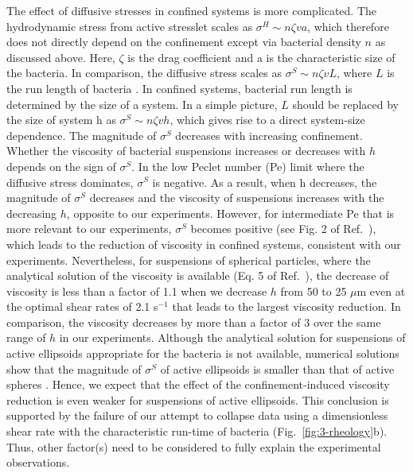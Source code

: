 The effect of diffusive stresses in confined systems is more complicated. The hydrodynamic stress from active stresslet scales as $\sigma^H \sim n\zeta v a$, which therefore does not directly depend on the confinement except via bacterial density $n$ as discussed
above. Here, $\zeta$ is the drag coefficient and a is the characteristic size of the bacteria. In comparison, the diffusive stress scales as $\sigma^S \sim n \zeta v L$, where $L$ is the run length of bacteria \cite{Takatori}. In confined systems, bacterial run length is determined by the size of a system. In a simple picture, $L$ should be replaced by the size of system h as $\sigma^S \sim n \zeta v h$, which gives rise to a direct system-size dependence. The magnitude of $\sigma^S$ decreases with increasing confinement. Whether the viscosity of bacterial suspensions increases or decreases with $h$ depends on the sign of $\sigma^S$. In the low Peclet number (Pe) limit where the diffusive stress dominates, $\sigma^S$ is negative. As a result, when h decreases, the magnitude of $\sigma^S$ decreases and the viscosity of suspensions increases with the decreasing $h$, opposite to our experiments.
However, for intermediate Pe that is more relevant to our experiments, $\sigma^S$ becomes positive (see Fig. 2 of Ref.~\cite{Takatori2017}), which leads to the reduction of viscosity in confined systems, consistent with our experiments. Nevertheless, for suspensions of spherical particles, where the analytical solution of the viscosity is available (Eq. 5 of Ref.~\cite{Takatori2017}), the decrease of viscosity is less than a factor of 1.1 when we decrease $h$ from 50 to 25 $\mu$m even at the optimal shear rates of 2.1 s$^{-1}$ that leads to the largest viscosity reduction. In comparison, the viscosity decreases by more than a factor of 3 over the same range of $h$ in our experiments. Although the analytical solution for suspensions of active ellipsoids appropriate for the bacteria is not available, numerical solutions show that the magnitude of $\sigma^S$ of active ellipsoids is smaller than that of active spheres \cite{Takatori2017}. Hence, we expect that the effect of the confinement-induced viscosity reduction is even weaker for suspensions of active ellipsoids.
This conclusion is supported by the failure of our attempt to collapse data using a dimensionless shear rate with the characteristic run-time of bacteria (Fig.~\ref{fig:3-rheology}b). Thus, other factor(s) need to be considered to fully explain the experimental observations.

